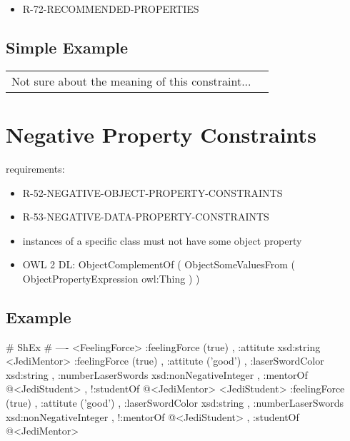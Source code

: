 \documentclass{llncs}
\newenvironment{DL}{
	\begin{center}
  \begin{tabular}{r l}

}{
  \end{tabular}
	\end{center}
}
\newcommand{\an}[1]{\todo[size=\small, color=green!40]{\textbf{Andy:} #1}}
\begin{document}
\begin{itemize}
	\item R-72-RECOMMENDED-PROPERTIES
\end{itemize}



\subsection{Simple Example}

\begin{DL}
Not sure about the meaning of this constraint...
\end{DL}

\an{not sure!}

\section{Negative Property Constraints}

requirements:

\begin{itemize}
	\item R-52-NEGATIVE-OBJECT-PROPERTY-CONSTRAINTS
	\item R-53-NEGATIVE-DATA-PROPERTY-CONSTRAINTS
\end{itemize}



\begin{itemize}
	\item instances of a specific class must not have some object property
  \item OWL 2 DL: ObjectComplementOf ( ObjectSomeValuesFrom ( ObjectPropertyExpression owl:Thing ) )
\end{itemize}

\subsection{Example}

\begin{ex}
# ShEx
# ----
<FeelingForce> {
    :feelingForce (true) ,
    :attitute xsd:string }
<JediMentor> {
    :feelingForce (true) ,
    :attitute ('good') ,
    :laserSwordColor xsd:string ,
    :numberLaserSwords xsd:nonNegativeInteger ,
    :mentorOf @<JediStudent> ,
   !:studentOf @<JediMentor> }
<JediStudent> {
    :feelingForce (true) ,
    :attitute ('good') ,
    :laserSwordColor xsd:string ,
    :numberLaserSwords xsd:nonNegativeInteger ,
   !:mentorOf @<JediStudent> ,
    :studentOf @<JediMentor> }
\end{ex}
\end{document}
